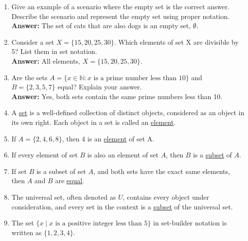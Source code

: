 \documentclass{article}
\begin{document}
\begin{enumerate}
    \item Give an example of a scenario where the empty set is the correct answer. Describe the scenario and represent the empty set using proper notation.\\
    \textbf{Answer:} The set of cats that are also dogs is an empty set, \( \emptyset \).\\[1em]

    \item Consider a set \( X = \{ 15, 20, 25, 30 \} \). Which elements of set X are divisible by 5? List them in set notation.\\
    \textbf{Answer:} All elements, \( X = \{ 15, 20, 25, 30 \} \).\\[1em]

    \item Are the sets \( A = \{ x \in \mathbb{N} : x \text{ is a prime number less than } 10 \} \) and \( B = \{ 2, 3, 5, 7 \} \) equal? Explain your answer.\\
    \textbf{Answer:} Yes, both sets contain the same prime numbers less than 10.\\[1em]

    \item A \underline{set} is a well-defined collection of distinct objects, considered as an object in its own right. Each object in a set is called an \underline{element}.\\[1em]

    \item If \( A = \{ 2, 4, 6, 8 \} \), then 4 is an \underline{element} of set A.\\[1em]

    \item If every element of set \( B \) is also an element of set \( A \), then \( B \) is a \underline{subset} of \( A \).\\[1em]

    \item If set \( B \) is a subset of set \( A \), and both sets have the exact same elements, then \( A \) and \( B \) are \underline{equal}.\\[1em]

    \item The universal set, often denoted as \underline{\( U \)}, contains every object under consideration, and every set in the context is a \underline{subset} of the universal set.\\[1em]

    \item The set \( \{ x \mid x \text{ is a positive integer less than } 5 \} \) in set-builder notation is written as \underline{\( \{ 1, 2, 3, 4 \} \)}.\\[1em]


\end{enumerate}
\end{document}
